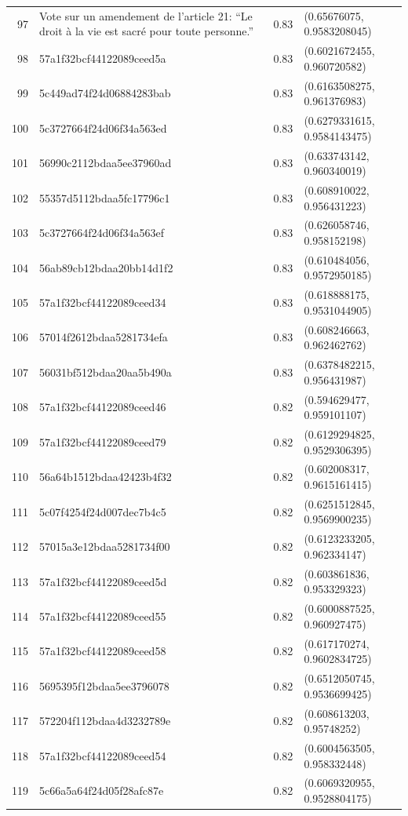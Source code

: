 \begin{table}[ht]
\begin{tabular}{rlrl}
  97 & Vote sur un amendement de l'article 21: “Le droit à la vie est sacré pour toute personne.” & 0.83 & (0.65676075, 0.9583208045) \\ 
  98 & 57a1f32bcf44122089ceed5a & 0.83 & (0.6021672455, 0.960720582) \\ 
  99 & 5c449ad74f24d06884283bab & 0.83 & (0.6163508275, 0.961376983) \\ 
  100 & 5c3727664f24d06f34a563ed & 0.83 & (0.6279331615, 0.9584143475) \\ 
  101 & 56990c2112bdaa5ee37960ad & 0.83 & (0.633743142, 0.960340019) \\ 
  102 & 55357d5112bdaa5fc17796c1 & 0.83 & (0.608910022, 0.956431223) \\ 
  103 & 5c3727664f24d06f34a563ef & 0.83 & (0.626058746, 0.958152198) \\ 
  104 & 56ab89cb12bdaa20bb14d1f2 & 0.83 & (0.610484056, 0.9572950185) \\ 
  105 & 57a1f32bcf44122089ceed34 & 0.83 & (0.618888175, 0.9531044905) \\ 
  106 & 57014f2612bdaa5281734efa & 0.83 & (0.608246663, 0.962462762) \\ 
  107 & 56031bf512bdaa20aa5b490a & 0.83 & (0.6378482215, 0.956431987) \\ 
  108 & 57a1f32bcf44122089ceed46 & 0.82 & (0.594629477, 0.959101107) \\ 
  109 & 57a1f32bcf44122089ceed79 & 0.82 & (0.6129294825, 0.9529306395) \\ 
  110 & 56a64b1512bdaa42423b4f32 & 0.82 & (0.602008317, 0.9615161415) \\ 
  111 & 5c07f4254f24d007dec7b4c5 & 0.82 & (0.6251512845, 0.9569900235) \\ 
  112 & 57015a3e12bdaa5281734f00 & 0.82 & (0.6123233205, 0.962334147) \\ 
  113 & 57a1f32bcf44122089ceed5d & 0.82 & (0.603861836, 0.953329323) \\ 
  114 & 57a1f32bcf44122089ceed55 & 0.82 & (0.6000887525, 0.960927475) \\ 
  115 & 57a1f32bcf44122089ceed58 & 0.82 & (0.617170274, 0.9602834725) \\ 
  116 & 5695395f12bdaa5ee3796078 & 0.82 & (0.6512050745, 0.9536699425) \\ 
  117 & 572204f112bdaa4d3232789e & 0.82 & (0.608613203, 0.95748252) \\ 
  118 & 57a1f32bcf44122089ceed54 & 0.82 & (0.6004563505, 0.958332448) \\ 
  119 & 5c66a5a64f24d05f28afc87e & 0.82 & (0.6069320955, 0.9528804175) \\ 

\end{tabular}
\end{table}
